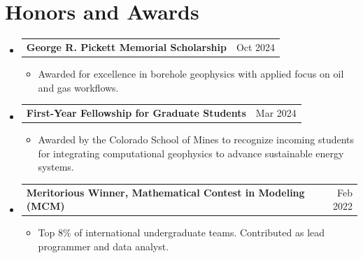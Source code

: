 \documentclass[letterpaper,13pt]{article}
\makeatletter
\newcommand{\resumeItem}[1]{\item\small{{#1 \vspace{-2pt}}}}
\newcommand{\resumeProjectHeading}[2]{
    \item
    \begin{tabular*}{0.97\textwidth}{l@{\extracolsep{\fill}}r}
      \small#1 & #2 \\
    \end{tabular*}\vspace{-7pt}
}
\newcommand{\resumeItemListStart}{\begin{itemize}[label={\small$\bullet$}]}
\newcommand{\resumeItemListEnd}{\end{itemize}\vspace{-5pt}}
\newcommand{\resumeSubHeadingListStart}{\begin{itemize}[leftmargin=0.15in, label={}]}
\newcommand{\resumeSubHeadingListEnd}{\end{itemize}}
\makeatother
\begin{document}
\section{Honors and Awards}
\resumeSubHeadingListStart

\resumeProjectHeading
  {\textbf{George R. Pickett Memorial Scholarship}}{Oct 2024}
\resumeItemListStart
  \resumeItem{Awarded for excellence in borehole geophysics with applied focus on oil and gas workflows.}
\resumeItemListEnd

\resumeProjectHeading
  {\textbf{First-Year Fellowship for Graduate Students}}{Mar 2024}
\resumeItemListStart
  \resumeItem{Awarded by the Colorado School of Mines to recognize incoming students for integrating computational geophysics to advance sustainable energy systems.}
\resumeItemListEnd

\resumeProjectHeading
  {\textbf{Meritorious Winner, Mathematical Contest in Modeling (MCM)}}{Feb 2022}
\resumeItemListStart
  \resumeItem{Top 8\% of international undergraduate teams. Contributed as lead programmer and data analyst.}
\resumeItemListEnd

\resumeSubHeadingListEnd
\end{document}
